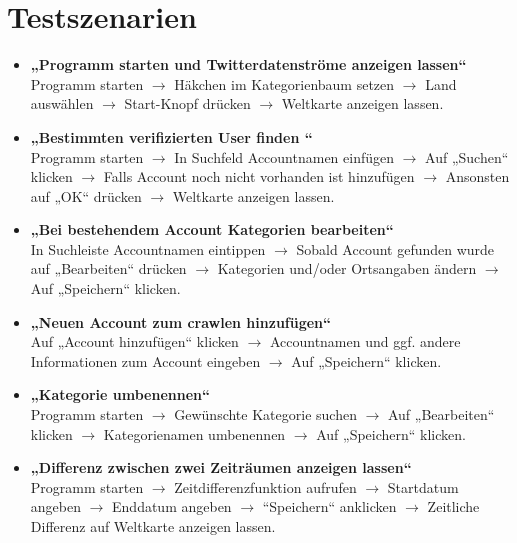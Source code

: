 
\section{Testszenarien}
\begin{itemize}
	\item \textbf{„Programm starten und Twitterdatenströme anzeigen lassen“}\\
Programm starten $\rightarrow$ Häkchen im Kategorienbaum setzen $\rightarrow$ Land auswählen $\rightarrow$ Start-Knopf drücken $\rightarrow$ Weltkarte anzeigen lassen.

	\item \textbf{„Bestimmten verifizierten User finden “}\\
Programm starten $\rightarrow$ In Suchfeld Accountnamen einfügen $\rightarrow$ Auf „Suchen“ klicken $\rightarrow$ Falls Account noch nicht vorhanden ist hinzufügen $\rightarrow$ Ansonsten auf „OK“ drücken $\rightarrow$ Weltkarte anzeigen lassen.

	\item \textbf{„Bei bestehendem Account Kategorien bearbeiten“}\\
In Suchleiste Accountnamen eintippen $\rightarrow$ Sobald Account gefunden wurde auf „Bearbeiten“ drücken $\rightarrow$ Kategorien und/oder Ortsangaben ändern $\rightarrow$ Auf „Speichern“ klicken.

	\item \textbf{„Neuen Account zum crawlen hinzufügen“}\\
Auf „Account hinzufügen“ klicken $\rightarrow$ Accountnamen und ggf. andere Informationen zum Account eingeben $\rightarrow$ Auf „Speichern“ klicken.

	\item \textbf{„Kategorie umbenennen“}\\
Programm starten $\rightarrow$ Gewünschte Kategorie suchen $\rightarrow$ Auf „Bearbeiten“  klicken $\rightarrow$ Kategorienamen umbenennen $\rightarrow$ Auf „Speichern“ klicken.

	\item \textbf{„Differenz zwischen zwei Zeiträumen anzeigen lassen“}\\
Programm starten $\rightarrow$ Zeitdifferenzfunktion aufrufen $\rightarrow$ Startdatum angeben $\rightarrow$ Enddatum angeben $\rightarrow$ “Speichern“ anklicken $\rightarrow$ Zeitliche Differenz auf Weltkarte anzeigen lassen.


\end{itemize}